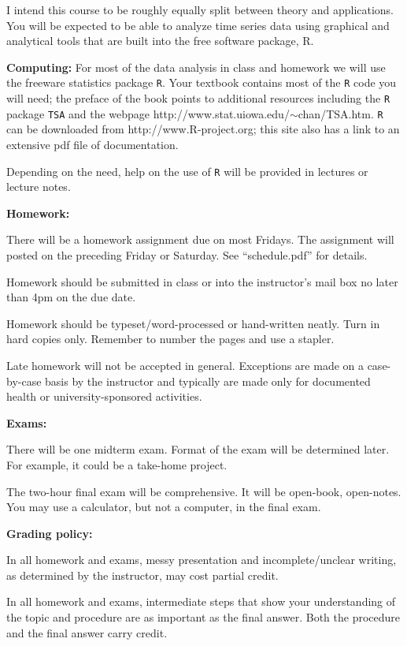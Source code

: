 \documentclass{article}
\begin{document}
I intend this course to be roughly equally split between theory and applications.
You will be expected to be able to analyze time series data
using  graphical and analytical
tools that are built into the free software package, R.


\bigskip
\textbf{\large Computing:}
For most of the data analysis in class and homework we will
use the freeware statistics package \texttt{R}.
Your textbook contains most of the \texttt{R} code you will need;
the preface of the book points to additional resources
including the \texttt{R} package \texttt{TSA} and the webpage
http://www.stat.uiowa.edu/$\sim$chan/TSA.htm.
\texttt{R} can be downloaded from http://www.R-project.org; this site
also has a link to an extensive pdf file of documentation.

Depending on the need,
help on the use of \texttt{R} will be provided in lectures
or lecture notes.


\bigskip
\textbf{\large Homework:}

There will be a homework assignment due on most Fridays.
The assignment will posted on the preceding Friday or Saturday.
See ``schedule.pdf'' for details.

Homework should be submitted in class or into the
instructor's mail box no later than 4pm on the due date.

Homework should be typeset/word-processed or hand-written neatly.
Turn in hard copies only. Remember to number the pages and use a stapler.

Late homework will not be accepted in general.
Exceptions are made
on a case-by-case basis by the instructor and typically are made only for
documented health or university-sponsored activities.

\bigskip
\textbf{\large Exams:}

There will be one midterm exam.
Format of the exam will be determined later.
For example, it could be a take-home project.

The two-hour final exam will be comprehensive.
It will be open-book, open-notes.
You may use a calculator, but not a computer, in the final exam.

\bigskip
\textbf{\large Grading policy:}

In all homework and exams,
messy presentation and incomplete/unclear writing, as determined by the
instructor, may cost partial credit.

In all homework and exams,
intermediate steps that show your understanding
of the topic and procedure are as important as the final answer.
Both the procedure and the final answer carry credit.
\end{document}
